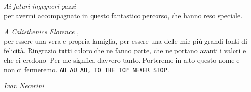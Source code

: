 \documentclass[twoside]{article}
\begin{document}
\textit{Ai futuri ingegneri pazzi}\\
per avermi accompagnato in questo fantastico percorso, che hanno reso speciale.

\vspace{\baselineskip}

\textit{A Calisthenics Florence \textcolor{darkviolet}{\faHeart}
},\\
per essere una vera e propria famiglia, per essere una delle mie più grandi fonti di felicità. Ringrazio tutti coloro che ne fanno parte, che ne portano avanti i valori e che ci credono. Per me signfica davvero tanto. Porteremo in alto questo nome e non ci fermeremo. \texttt{AU AU AU, TO THE TOP NEVER STOP}. 

\vspace{\baselineskip}

\begin{flushright}
\textit{Ivan Necerini}
\end{flushright}


\newpage
\mbox{}
\newpage

\newpage
\mbox{}
\newpage

\newpage
\mbox{}
\newpage

\end{document}
